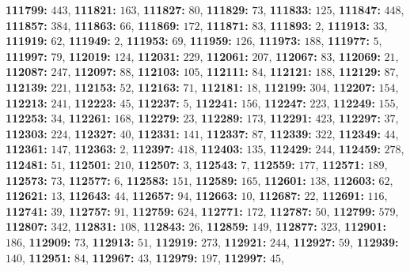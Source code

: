 \textsf{\bfseries 111799:} $443$, \textsf{\bfseries 111821:} $163$, \textsf{\bfseries 111827:} $80$, \textsf{\bfseries 111829:} $73$, \textsf{\bfseries 111833:} $125$, \textsf{\bfseries 111847:} $448$, \textsf{\bfseries 111857:} $384$, \textsf{\bfseries 111863:} $66$, \textsf{\bfseries 111869:} $172$, \textsf{\bfseries 111871:} $83$, \textsf{\bfseries 111893:} $2$, \textsf{\bfseries 111913:} $33$, \textsf{\bfseries 111919:} $62$, \textsf{\bfseries 111949:} $2$, \textsf{\bfseries 111953:} $69$, \textsf{\bfseries 111959:} $126$, \textsf{\bfseries 111973:} $188$, \textsf{\bfseries 111977:} $5$, \textsf{\bfseries 111997:} $79$, \textsf{\bfseries 112019:} $124$, \textsf{\bfseries 112031:} $229$, \textsf{\bfseries 112061:} $207$, \textsf{\bfseries 112067:} $83$, \textsf{\bfseries 112069:} $21$, \textsf{\bfseries 112087:} $247$, \textsf{\bfseries 112097:} $88$, \textsf{\bfseries 112103:} $105$, \textsf{\bfseries 112111:} $84$, \textsf{\bfseries 112121:} $188$, \textsf{\bfseries 112129:} $87$, \textsf{\bfseries 112139:} $221$, \textsf{\bfseries 112153:} $52$, \textsf{\bfseries 112163:} $71$, \textsf{\bfseries 112181:} $18$, \textsf{\bfseries 112199:} $304$, \textsf{\bfseries 112207:} $154$, \textsf{\bfseries 112213:} $241$, \textsf{\bfseries 112223:} $45$, \textsf{\bfseries 112237:} $5$, \textsf{\bfseries 112241:} $156$, \textsf{\bfseries 112247:} $223$, \textsf{\bfseries 112249:} $155$, \textsf{\bfseries 112253:} $34$, \textsf{\bfseries 112261:} $168$, \textsf{\bfseries 112279:} $23$, \textsf{\bfseries 112289:} $173$, \textsf{\bfseries 112291:} $423$, \textsf{\bfseries 112297:} $37$, \textsf{\bfseries 112303:} $224$, \textsf{\bfseries 112327:} $40$, \textsf{\bfseries 112331:} $141$, \textsf{\bfseries 112337:} $87$, \textsf{\bfseries 112339:} $322$, \textsf{\bfseries 112349:} $44$, \textsf{\bfseries 112361:} $147$, \textsf{\bfseries 112363:} $2$, \textsf{\bfseries 112397:} $418$, \textsf{\bfseries 112403:} $135$, \textsf{\bfseries 112429:} $244$, \textsf{\bfseries 112459:} $278$, \textsf{\bfseries 112481:} $51$, \textsf{\bfseries 112501:} $210$, \textsf{\bfseries 112507:} $3$, \textsf{\bfseries 112543:} $7$, \textsf{\bfseries 112559:} $177$, \textsf{\bfseries 112571:} $189$, \textsf{\bfseries 112573:} $73$, \textsf{\bfseries 112577:} $6$, \textsf{\bfseries 112583:} $151$, \textsf{\bfseries 112589:} $165$, \textsf{\bfseries 112601:} $138$, \textsf{\bfseries 112603:} $62$, \textsf{\bfseries 112621:} $13$, \textsf{\bfseries 112643:} $44$, \textsf{\bfseries 112657:} $94$, \textsf{\bfseries 112663:} $10$, \textsf{\bfseries 112687:} $22$, \textsf{\bfseries 112691:} $116$, \textsf{\bfseries 112741:} $39$, \textsf{\bfseries 112757:} $91$, \textsf{\bfseries 112759:} $624$, \textsf{\bfseries 112771:} $172$, \textsf{\bfseries 112787:} $50$, \textsf{\bfseries 112799:} $579$, \textsf{\bfseries 112807:} $342$, \textsf{\bfseries 112831:} $108$, \textsf{\bfseries 112843:} $26$, \textsf{\bfseries 112859:} $149$, \textsf{\bfseries 112877:} $323$, \textsf{\bfseries 112901:} $186$, \textsf{\bfseries 112909:} $73$, \textsf{\bfseries 112913:} $51$, \textsf{\bfseries 112919:} $273$, \textsf{\bfseries 112921:} $244$, \textsf{\bfseries 112927:} $59$, \textsf{\bfseries 112939:} $140$, \textsf{\bfseries 112951:} $84$, \textsf{\bfseries 112967:} $43$, \textsf{\bfseries 112979:} $197$, \textsf{\bfseries 112997:} $45$, 
